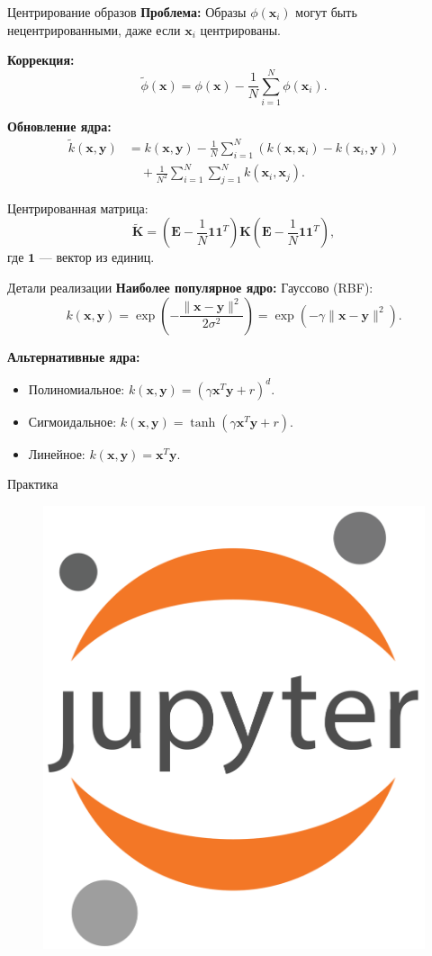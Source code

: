 \begin{frame}[allowframebreaks]{Центрирование образов}
    \textbf{Проблема:}
    Образы $\phi(\boldsymbol{x}_i)$ могут быть нецентрированными, даже если $\boldsymbol{x}_i$ центрированы.

    \textbf{Коррекция:}
    \begin{equation*}
        \tilde{\phi}(\boldsymbol{x}) = \phi(\boldsymbol{x}) - \frac{1}{N}\sum_{i=1}^N\phi(\boldsymbol{x}_i).
    \end{equation*}

    \framebreak

    \textbf{Обновление ядра:}
    \begin{align*}
        \tilde{k}(\boldsymbol{x}, \boldsymbol{y}) & = k(\boldsymbol{x}, \boldsymbol{y}) - \frac{1}{N}\sum_{i=1}^N\left(k(\boldsymbol{x}, \boldsymbol{x}_i) - k(\boldsymbol{x}_i, \boldsymbol{y})\right) \\
                                                  & \quad + \frac{1}{N^2}\sum_{i=1}^N\sum_{j=1}^N k(\boldsymbol{x}_i, \boldsymbol{x}_j).
    \end{align*}

    Центрированная матрица:
    \begin{equation*}
        \tilde{\mathbf{K}} = \left(\mathbf{E} - \frac{1}{N}\mathbf{1}\mathbf{1}^T\right)\mathbf{K}\left(\mathbf{E} - \frac{1}{N}\mathbf{1}\mathbf{1}^T\right),
    \end{equation*}
    где $\mathbf{1}$ — вектор из единиц.
\end{frame}

\begin{frame}{Детали реализации}
    \textbf{Наиболее популярное ядро:} Гауссово (RBF):
    \begin{equation*}
        k(\boldsymbol{x}, \boldsymbol{y}) = \exp\left(-\frac{\|\boldsymbol{x} - \boldsymbol{y}\|^2}{2\sigma^2}\right) = \exp\left(-\gamma\|\boldsymbol{x} - \boldsymbol{y}\|^2\right).
    \end{equation*}

    \textbf{Альтернативные ядра:}
    \begin{itemize}
        \item Полиномиальное: $k(\boldsymbol{x}, \boldsymbol{y}) = (\gamma\boldsymbol{x}^T\boldsymbol{y} + r)^d$.
        \item Сигмоидальное: $k(\boldsymbol{x}, \boldsymbol{y}) = \tanh(\gamma\boldsymbol{x}^T\boldsymbol{y} + r)$.
        \item Линейное: $k(\boldsymbol{x}, \boldsymbol{y}) = \boldsymbol{x}^T\boldsymbol{y}$.
    \end{itemize}
\end{frame}

\begin{frame}{Практика}
    \begin{figure}
        \centering
        \includegraphics[width=.3\textwidth]{../resources/overall/Jupyter_logo.png}
    \end{figure}
\end{frame}
